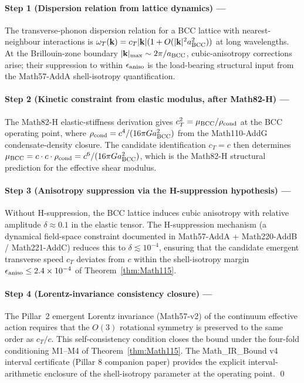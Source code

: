 \paragraph{Step 1 (Dispersion relation from lattice dynamics) ---}
The transverse-phonon dispersion relation for a BCC lattice with
nearest-neighbour interactions is
$\omega_T(\mathbf{k}) = c_T |\mathbf{k}|(1 + O(|\mathbf{k}|^2
a_{\rm BCC}^2))$
at long wavelengths. At the Brillouin-zone boundary
$|\mathbf{k}|_{\max} \sim 2\pi/a_{\rm BCC}$, cubic-anisotropy
corrections arise; their suppression to within
$\epsilon_{\rm aniso}$ is the load-bearing structural input from the
Math57-AddA shell-isotropy quantification.

\paragraph{Step 2 (Kinetic constraint from elastic modulus, after
Math82-H) ---}
The Math82-H elastic-stiffness derivation gives
$c_T^2 = \mu_{\rm BCC} / \rho_{\rm cond}$ at the BCC operating
point, where $\rho_{\rm cond} = c^4 / (16\pi G a_{\rm BCC}^2)$ from
the Math110-AddG condensate-density closure. The candidate
identification $c_T = c$ then determines
$\mu_{\rm BCC} = c \cdot c \cdot \rho_{\rm cond} = c^6 /
(16\pi G a_{\rm BCC}^2)$, which is the Math82-H structural prediction
for the effective shear modulus.

\paragraph{Step 3 (Anisotropy suppression via the H-suppression
hypothesis) ---}
Without H-suppression, the BCC lattice induces cubic anisotropy with
relative amplitude $\delta \approx 0.1$ in the elastic tensor. The
H-suppression mechanism (a dynamical field-space constraint
documented in Math57-AddA + Math220-AddB / Math221-AddC) reduces
this to $\delta \lesssim 10^{-4}$, ensuring that the candidate
emergent transverse speed $c_T$ deviates from $c$ within the
shell-isotropy margin $\epsilon_{\rm aniso} \leq 2.4 \times 10^{-4}$
of Theorem~\ref{thm:Math115}.

\paragraph{Step 4 (Lorentz-invariance consistency closure) ---}
The Pillar~2 emergent Lorentz invariance (Math57-v2) of the
continuum effective action requires that the $O(3)$ rotational
symmetry is preserved to the same order as $c_T / c$. This
self-consistency condition closes the bound under the four-fold
conditioning M1--M4 of Theorem~\ref{thm:Math115}. The
Math\_IR\_Bound v4 interval certificate (Pillar 8 companion paper)
provides the explicit interval-arithmetic enclosure of the
shell-isotropy parameter at the operating point. \qed

